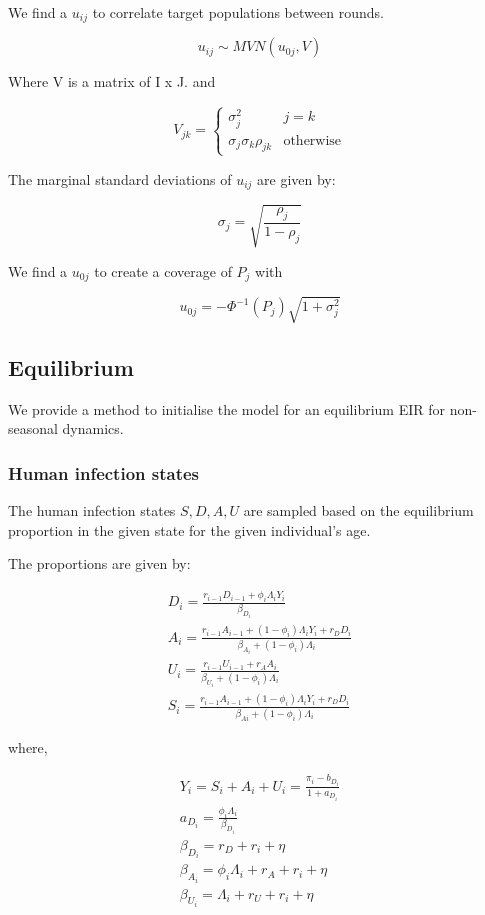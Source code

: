 \documentclass{bmcart}
\begin{document}
We find a $u_{ij}$ to correlate target populations between rounds.

\[u_{ij} \sim MVN(u_{0j}, V)\]

Where V is a matrix of I x J. and

\[
V_{jk} =
\begin{cases} 
  \sigma_j^2  & j = k \\
  \sigma_j\sigma_k\rho_{jk} & \text{otherwise}
\end{cases}
\]

The marginal standard deviations of $u_{ij}$ are given by:

\[\sigma_j = \sqrt{\frac{\rho_j}{1 - \rho_j}}\]

We find a $u_{0j}$ to create a coverage of $P_j$ with

\[ u_{0j} = -\Phi^{-1}(P_j)\sqrt{1 + \sigma_j^2} \]

\subsection*{Equilibrium}

We provide a method to initialise the model for an equilibrium EIR for non-seasonal dynamics.

\subsubsection*{Human infection states}

The human infection states ${S, D, A, U}$ are sampled based on the equilibrium proportion in the given state for the given individual's age.

The proportions are given by:

\begin{gather*}
    D_i = \frac{r_{i-1}D_{i-1} + \phi_i\Lambda_iY_i}{\beta_{D_i}} \\
    A_i = \frac{r_{i-1}A_{i-1} + (1-\phi_i)\Lambda_iY_i + r_DD_i}{\beta_{A_i} + (1-\phi_i)\Lambda_i} \\
    U_i = \frac{r_{i-1}U_{i-1} + r_{A}A_{i}}{\beta_{U_i} + (1-\phi_i)\Lambda_i} \\
    S_i = \frac{r_{i-1}A_{i-1} + (1-\phi_i)\Lambda_iY_i + r_DD_i}{\beta_{Ai} + (1-\phi_i)\Lambda_i}
\end{gather*}

where,

\begin{gather*}
    Y_i = S_i + A_i + U_i = \frac{\pi_i - b_{D_i}}{1 + a_{D_i}} \\
    a_{D_i} = \frac{\phi_i\Lambda_i}{\beta_{D_i}} \\
    \beta_{D_i} = r_D + r_i + \eta \\
    \beta_{A_i} = \phi_i\Lambda_i + r_A + r_i + \eta \\
    \beta_{U_i} = \Lambda_i + r_U + r_i + \eta
\end{gather*}
\end{document}

